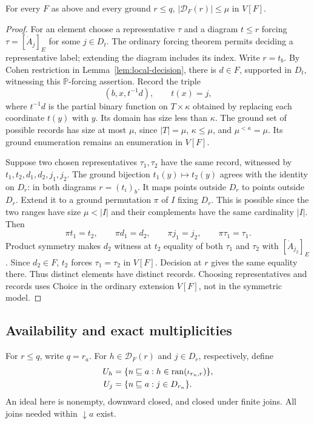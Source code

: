 \begin{lemma}\label{lem:local-quotient-bound}
For every $F$ as above and every ground $r\le q$,
$|\mathcal D_F(r)|\le\mu$ in $V[F]$.
\end{lemma}
\begin{proof}
For an element choose a representative $\tau$ and a diagram $t\le r$
forcing $\tau=[\dot A_j]_E$ for some $j\in D_t$. The ordinary forcing
theorem permits deciding a representative label; extending the diagram
includes its index. Write $r=t_b$. By Cohen restriction in
Lemma~\ref{lem:local-decision}, there is $d\in F$, supported in $D_t$,
witnessing this $\mathbb P$-forcing assertion. Record the triple
\[
 (b,x,t^{-1}d),\qquad t(x)=j,
\]
where $t^{-1}d$ is the partial binary function on $T\times\kappa$
obtained by replacing each coordinate $t(y)$ with $y$. Its domain has
size less than $\kappa$. The ground set of possible records has size
at most $\mu$, since $|T|=\mu$, $\kappa\le\mu$, and
$\mu^{<\kappa}=\mu$. Its ground enumeration remains an enumeration in
$V[F]$.

Suppose two chosen representatives $\tau_1,\tau_2$ have the same
record, witnessed by $t_1,t_2,d_1,d_2,j_1,j_2$. The ground bijection
$t_1(y)\mapsto t_2(y)$ agrees with the identity on $D_r$: in both
diagrams $r=(t_i)_b$. It maps points outside $D_r$ to points outside
$D_r$. Extend it to a ground permutation $\pi$ of $I$ fixing $D_r$.
This is possible since the two ranges have size $\mu<|I|$ and their
complements have the same cardinality $|I|$. Then
\[
 \pi t_1=t_2,\qquad \pi d_1=d_2,\qquad \pi j_1=j_2,
 \qquad \pi\tau_1=\tau_1.
\]
Product symmetry makes $d_2$ witness at $t_2$ equality of both
$\tau_1$ and $\tau_2$ with $[\dot A_{j_2}]_E$. Since $d_2\in F$,
$t_2$ forces $\tau_1=\tau_2$ in $V[F]$. Decision at $r$ gives the
same equality there. Thus distinct elements have distinct records.
Choosing representatives and records uses Choice in the ordinary
extension $V[F]$, not in the symmetric model.
\end{proof}

\subsection{Availability and exact multiplicities}

For $r\le q$, write $q=r_a$. For $h\in\mathcal D_F(r)$ and
$j\in D_r$, respectively, define
\begin{align}
 U_h&=\{n\sqsubseteq a:
             h\in\operatorname{ran}(\iota_{r_n,r})\},\label{eq:class-availability}\\
 U_j&=\{n\sqsubseteq a:j\in D_{r_n}\}.
             \label{eq:label-availability}
\end{align}
An ideal here is nonempty, downward closed, and closed under finite
joins. All joins needed within $\downarrow a$ exist.

